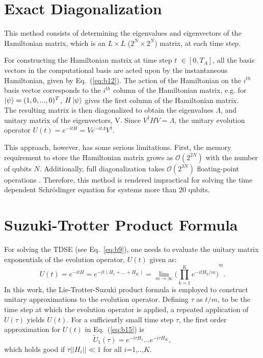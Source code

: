 \documentclass[../main.tex]{subfiles}
\begin{document}
\section{Exact Diagonalization}
This method consists of determining the eigenvalues and eigenvectors of the Hamiltonian matrix, which is an $L\times L$ ($2^N \times 2^N$) matrix, at each time step.

For constructing the Hamiltonian matrix at time step $t$ $\in [0,T_A]$, all the basis vectors in the computational basis are acted upon by the instantaneous Hamiltonian, given by Eq.~(\ref{eq:b12}). The action of the Hamiltonian on the $i^{th}$ basis vector corresponds to the $i^{th}$ column of the Hamiltonian matrix, e.g. for $\ket{\psi}=(1,0,...,0)^T$, $H\ket{\psi}$ gives the first column of the Hamiltonian matrix. \\
The resulting matrix is then diagonalized to obtain the eigenvalues $\Lambda$, and unitary matrix of the eigenvectors, V. Since $V^{\dagger}HV=\Lambda$, the unitary evolution operator $U(t)=e^{-itH}=Ve^{-it\Lambda}V^{\dagger}$.


This approach, however, has some serious limitations. First, the memory requirement to store the Hamiltonian matrix grows as $\mathcal{O}(2^{2N})$ with the number of qubits $N$. Additionally, full diagonalization takes $\mathcal{O}(2^{3N})$ floating-point operations \cite{de2004computational}. Therefore, this method is rendered impractical for solving the time dependent Schr{\"o}dinger equation for systems more than 20 qubits.

\section{Suzuki-Trotter Product Formula} 
For solving the TDSE (see Eq.~\ref{eq:b9}), one needs to evaluate the unitary matrix exponentials of the evolution operator, $U(t)$ given as:
\begin{equation}
U(t)= e^{-itH}= e^{-it(H_1+...+H_K)}= \lim\limits_{m \to \infty} {\bigg(\prod_{k=1}^{K}e^{-itH_k/m} \bigg)}^m.    \label{eq:b15}
\end{equation}
In this work, the Lie-Trotter-Suzuki product formula \cite{de2004computational,trotter1959product,suzuki1977monte} is employed to construct unitary approximations to the evolution operator. Defining $\tau$ as $t/m$, to be the time step at which the evolution operator is applied, a repeated application of $U(\tau)$ yields $U(t)$. For a sufficiently small time step $\tau$, the first order approximation for $U(t)$ in Eq.~(\ref{eq:b15}) is
\begin{equation}
\tilde{U}_1(\tau)=e^{-i\tau H_1}...e^{-i\tau H_K},    \label{eq:b16}
\end{equation}
which holds good if $\tau \left| \left| H_i \right| \right| \ll 1$ for all $i$=1,..,$K$.
\end{document}
